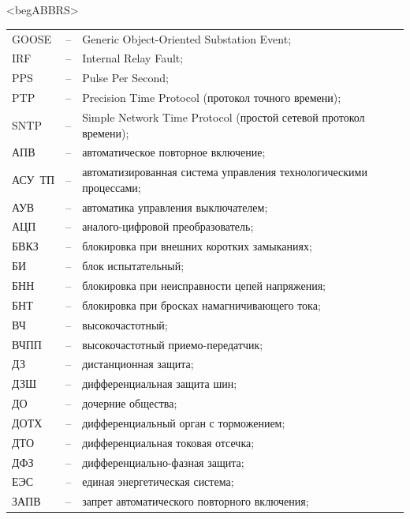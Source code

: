 \color{unimain}\section*{}
{\color{white}\fontsize{0.1pt}{0.1pt}\selectfont<begABBRS>}
\color{black}
\begin{longtable}{>{\raggedright\arraybackslash}m{2cm}>{\raggedright\arraybackslash}m{0.5cm}>{\raggedright\arraybackslash}m{20cm}}
\endfirsthead\endhead\endfoot\endlastfoot
GOOSE & -- & Generic Object-Oriented Substation Event; \\
IRF & -- & Internal Relay Fault; \\
PPS & -- & Pulse Per Second; \\
PTP & -- & Precision Time Protocol (протокол точного времени); \\
SNTP & -- & Simple Network Time Protocol (простой сетевой протокол времени); \\
АПВ & -- & автоматическое повторное включение; \\
АСУ~ТП & -- & автоматизированная система управления технологическими процессами; \\
АУВ & -- & автоматика управления выключателем; \\
АЦП & -- & аналого-цифровой преобразователь; \\
БВКЗ & -- & блокировка при внешних коротких замыканиях; \\
БИ & -- & блок испытательный; \\
БНН & -- & блокировка при неисправности цепей напряжения; \\
БНТ & -- & блокировка при бросках намагничивающего тока; \\
ВЧ & -- & высокочастотный; \\
ВЧПП & -- & высокочастотный приемо-передатчик; \\
ДЗ & -- & дистанционная защита; \\
ДЗШ & -- & дифференциальная защита шин; \\
ДО & -- & дочерние общества; \\
ДОТХ & -- & дифференциальный орган с торможением; \\
ДТО & -- & дифференциальная токовая отсечка; \\
ДФЗ & -- & дифференциально-фазная защита; \\
ЕЭС & -- & единая энергетическая система; \\
ЗАПВ & -- & запрет автоматического повторного включения; \\

\end{longtable}
